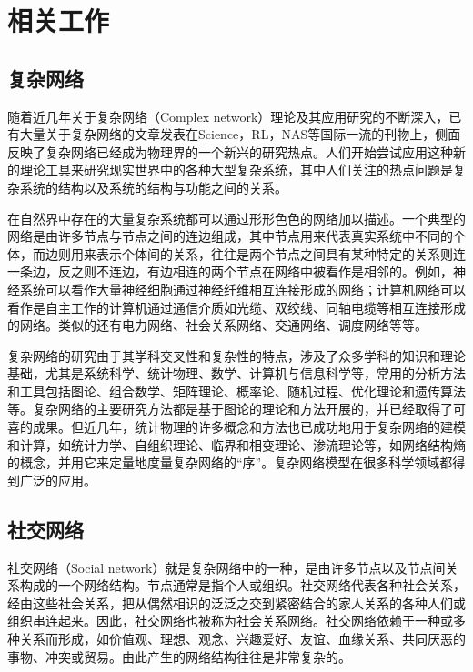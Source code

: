\chapter{相关工作}
\label{chap:intro}
\section{复杂网络}

随着近几年关于复杂网络（Complex network）理论及其应用研究的不断深入，已有大量关于复杂网络的文章发表在Science，RL，NAS等国际一流的刊物上，侧面反映了复杂网络已经成为物理界的一个新兴的研究热点。人们开始尝试应用这种新的理论工具来研究现实世界中的各种大型复杂系统，其中人们关注的热点问题是复杂系统的结构以及系统的结构与功能之间的关系。

在自然界中存在的大量复杂系统都可以通过形形色色的网络加以描述。一个典型的网络是由许多节点与节点之间的连边组成，其中节点用来代表真实系统中不同的个体，而边则用来表示个体间的关系，往往是两个节点之间具有某种特定的关系则连一条边，反之则不连边，有边相连的两个节点在网络中被看作是相邻的。例如，神经系统可以看作大量神经细胞通过神经纤维相互连接形成的网络；计算机网络可以看作是自主工作的计算机通过通信介质如光缆、双绞线、同轴电缆等相互连接形成的网络。类似的还有电力网络、社会关系网络、交通网络、调度网络等等。

复杂网络的研究由于其学科交叉性和复杂性的特点，涉及了众多学科的知识和理论基础，尤其是系统科学、统计物理、数学、计算机与信息科学等，常用的分析方法和工具包括图论、组合数学、矩阵理论、概率论、随机过程、优化理论和遗传算法等。复杂网络的主要研究方法都是基于图论的理论和方法开展的，并已经取得了可喜的成果。但近几年，统计物理的许多概念和方法也已成功地用于复杂网络的建模和计算，如统计力学、自组织理论、临界和相变理论、渗流理论等，如网络结构熵的概念，并用它来定量地度量复杂网络的“序”。复杂网络模型在很多科学领域都得到广泛的应用。

\section{社交网络}

社交网络（Social network）就是复杂网络中的一种，是由许多节点以及节点间关系构成的一个网络结构。节点通常是指个人或组织。社交网络代表各种社会关系，经由这些社会关系，把从偶然相识的泛泛之交到紧密结合的家人关系的各种人们或组织串连起来。因此，社交网络也被称为社会关系网络。社交网络依赖于一种或多种关系而形成，如价值观、理想、观念、兴趣爱好、友谊、血缘关系、共同厌恶的事物、冲突或贸易。由此产生的网络结构往往是非常复杂的。

